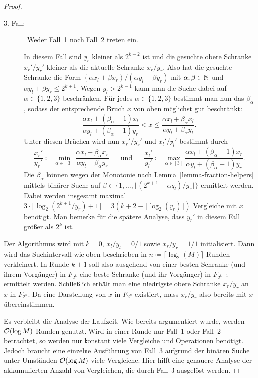 \begin{proof}
\begin{description}
		\item[3. Fall:]~Weder Fall~1 noch Fall~2 treten ein.
		
			In diesem Fall sind $y_r$ kleiner als $2^{k-2}$ ist und die gesuchte obere Schranke $x_r'/y_r'$ kleiner als die aktuelle Schranke $x_r/y_r$.
			Also hat die gesuchte Schranke die Form $(\alpha x_l + \beta x_r)/(\alpha y_l + \beta y_r)$ mit $\alpha,\beta\in\mathbb{N}$ und $\alpha y_l + \beta y_r\leq 2^{k+1}$.
			Wegen $y_l > 2^{k-1}$ kann man die Suche dabei auf $\alpha \in \{ 1, 2, 3 \}$ beschränken.
			Für jedes $\alpha\in\{1,2,3\}$ bestimmt man nun das $\beta_\alpha$, sodass der entsprechende Bruch $x$ von oben möglichst gut beschränkt:
			\[
				\frac{\alpha x_l + (\beta_\alpha - 1) x_l}{\alpha y_l + (\beta_\alpha - 1) y_r} < x \leq \frac{\alpha x_l + \beta_\alpha x_l}{\alpha y_l + \beta_\alpha y_l}.
			\]
			Unter diesen Brüchen wird nun $x_r'/y_r'$ und $x_l'/y_l'$ bestimmt durch
			\[\frac{x_r'}{y_r'}\coloneq \min_{\alpha\in[3]} \frac{\alpha x_l + \beta_\alpha x_r}{\alpha y_l + \beta_\alpha y_r}
			\text{~~~~~und~~~~~}
			\frac{x_l'}{y_l'}\coloneq \max_{\alpha\in[3]} 			\frac{\alpha x_l + (\beta_\alpha - 1)x_r}{\alpha y_l + (\beta_\alpha - 1)y_r}.
			\]
			Die $\beta_\alpha$ können wegen der Monotonie nach Lemma~\ref{lemma-fraction-helpers} mittels binärer Suche auf $\beta \in \{1,\dots, \lfloor (2^{k+1} - \alpha y_l) / y_r \rfloor \}$ ermittelt werden.
			Dabei werden insgesamt maximal $3 \cdot \lfloor \log_2(2^{k+1} / y_r) + 1 \rfloor = 3 (k+2 - \lceil\log_2(y_r)\rceil)$ Vergleiche mit $x$ benötigt.
			Man bemerke für die spätere Analyse, dass $y_r'$ in diesem Fall größer als $2^k$ ist.
 	\end{description}
 	
 	Der Algorithmus wird mit $k=0$, $x_l/y_l$ = $0/1$ sowie $x_r/y_r = 1/1$ initialisiert.
 	Dann wird das Suchintervall wie oben beschrieben in $n\coloneq \lceil \log_2(M) \rceil$ Runden verkleinert.
 	In Runde $k+1$ soll also ausgehend von einer besten Schranke (und ihrem Vorgänger) in $F_{2^k}$ eine beste Schranke (und ihr Vorgänger) in $F_{2^{k+1}}$ ermittelt werden.
 	Schließlich erhält man eine niedrigste obere Schranke $x_r/y_r$ an $x$ in $F_{2^n}$.
 	Da eine Darstellung von $x$ in $F_{2^n}$ existiert, muss $x_r/y_r$ also bereits mit $x$ übereinstimmen.
 	
 	Es verbleibt die Analyse der Laufzeit.
 	Wie bereits argumentiert wurde, werden $\mathcal{O}(\log M)$ Runden genutzt.
 	Wird in einer Runde nur Fall~1 oder Fall~2 betrachtet, so werden nur konstant viele Vergleiche und Operationen benötigt.
 	Jedoch braucht eine einzelne Ausführung von Fall~3 aufgrund der binären Suche unter Umständen $\mathcal{O}(\log M)$ viele Vergleiche.
 	Hier hilft eine genauere Analyse der akkumulierten Anzahl von Vergleichen, die durch Fall~3 ausgelöst werden.
 	

\end{proof}
